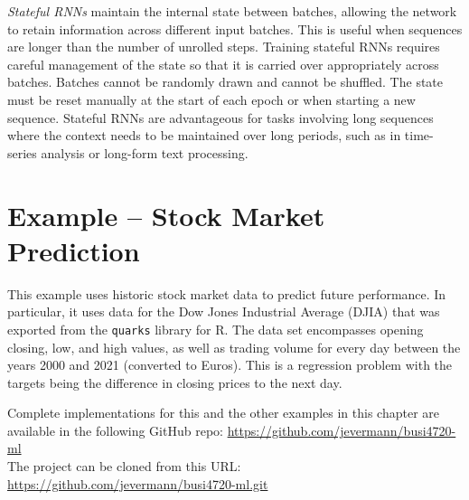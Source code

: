 \emph{Stateful RNNs} maintain the internal state between batches, allowing the network to retain information across different input batches. This is useful when sequences are longer than the number of unrolled steps. Training stateful RNNs requires careful management of the state so that it is carried over appropriately across batches. Batches cannot be randomly drawn and cannot be shuffled. The state must be reset manually at the start of each epoch or when starting a new sequence. Stateful RNNs are advantageous for tasks involving long sequences where the context needs to be maintained over long periods, such as in time-series analysis or long-form text processing.

\section{Example -- Stock Market Prediction}

This example uses historic stock market data to predict future performance. In particular, it uses data for the Dow Jones Industrial Average (DJIA) that was exported from the \texttt{quarks} library for R. The data set encompasses opening closing, low, and high values, as well as trading volume for every day between the years 2000 and 2021 (converted to Euros). This is a regression problem with the targets being the difference in closing prices to the next day.

\begin{resourcebox}
Complete implementations for this and the other examples in this chapter are available in the following GitHub repo:
\small\url{https://github.com/jevermann/busi4720-ml}\normalsize \\

The project can be cloned from this URL: \small\url{https://github.com/jevermann/busi4720-ml.git}\normalsize
\end{resourcebox}

